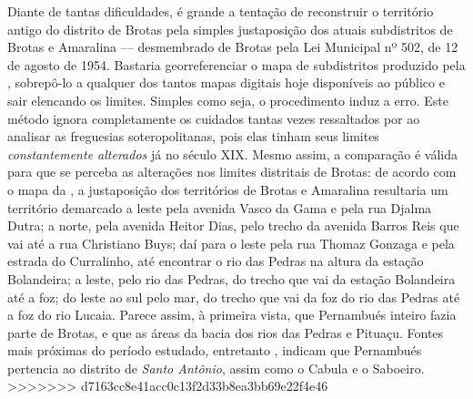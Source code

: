 Diante de tantas dificuldades, é grande a tentação de reconstruir o território antigo do distrito de Brotas pela simples justaposição dos atuais subdistritos de Brotas e Amaralina --- desmembrado de Brotas pela Lei Municipal nº 502, de 12 de agosto de 1954. Bastaria georreferenciar o mapa de subdistritos produzido pela , sobrepô-lo a qualquer dos tantos mapas digitais hoje disponíveis ao público e sair elencando os limites. Simples como seja, o procedimento induz a erro. Este método ignora completamente os cuidados tantas vezes ressaltados por  ao analisar as freguesias soteropolitanas, pois elas tinham seus limites \textit{constantemente alterados} já no século XIX. Mesmo assim, a comparação é válida para que se perceba as alterações nos limites distritais de Brotas: de acordo com o mapa da , a justaposição dos territórios de Brotas e Amaralina resultaria um território demarcado a leste pela avenida Vasco da Gama e pela rua Djalma Dutra; a norte, pela avenida Heitor Dias, pelo trecho da avenida Barros Reis que vai até a rua Christiano Buys; daí para o leste pela rua Thomaz Gonzaga e pela estrada do Curralinho, até encontrar o rio das Pedras na altura da estação Bolandeira; a leste, pelo rio das Pedras, do trecho que vai da estação Bolandeira até a foz; do leste ao sul pelo mar, do trecho que vai da foz do rio das Pedras até a foz do rio Lucaia. Parece assim, à primeira vista, que Pernambués inteiro fazia parte de Brotas, e que as áreas da bacia dos rios das Pedras e Pituaçu. Fontes mais próximas do período estudado, entretanto \cite{souza_guia_1935}, indicam que Pernambués pertencia ao distrito de \textit{Santo Antônio}, assim como o Cabula e o Saboeiro.
>>>>>>> d7163cc8e41acc0c13f2d33b8ea3bb69e22f4e46
